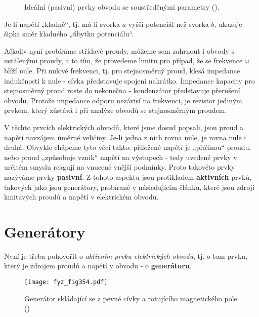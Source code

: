   \begin{figure}[hb!] %
    \centering
    \caption{Ideální (pasivní) prvky obvodu se soustředěnými parametry
             (\cite[s.~394]{Feynman02}).}
    \label{fyz:fig353}
  \end{figure}
  
  Je-li napětí „kladné“, tj. má-li svorka \(a\) vyšší potenciál než svorka \(b\), ukazuje šipka 
  směr kladného „úbytku potenciálu“.
  
  Ačkoliv nyní probíráme střídavé proudy, můžeme sem zahrnout i obvody s ustálenými proudy, a to 
  tím, že provedeme limitu pro případ, že se frekvence \(\omega\) blíží nule. Při nulové frekvenci, 
  tj. pro stejnosměrný proud, klesá impedance indukčnosti k nule - cívka představuje spojení 
  nakrátko. Impedance kapacity pro stejnosměrný proud roste do nekonečna - kondenzátor představuje 
  přerušení obvodu. Protože impedance odporu nezávisí na frekvenci, je rezistor jediným prvkem, 
  který zůstává i při analýze obvodů se stejnosměrným proudem.
  
  V těchto prvcích elektrických obvodů, které jsme dosud popsali, jsou proud a napětí navzájem 
  úměrné veličiny. Je-li jedna z nich rovna nule, je rovna nule i druhá. Obvykle chápeme tyto věci 
  takto: přiložené napětí je „příčinou“ proudu, nebo proud „způsobuje vznik“ napětí na výstupech - 
  tedy uvedené prvky v určitém smyslu reagují na vnucené vnější podmínky. Proto takovéto prvky 
  nazýváme prvky \textbf{pasivní}. Z tohoto aspektu jsou protikladem \textbf{aktivních} prvků, 
  takových jako jsou generátory, probírané v následujícím článku, které jsou zdroji kmitavých 
  proudů a napětí v elektrickém obvodu.

\section{Generátory}\label{fyz:IIchapXXIIsecII}
  Nyní je třeba pohovořit o \emph{aktivním prvku elektrických obvodů}, tj. o tom prvku, který je 
  zdrojem proudů a napětí v obvodu - o \textbf{generátoru}.
  
  \begin{figure}[ht!] %
    \centering
    \texttt{[image: fyz\_fig354.pdf]}
    \caption{Generátor skládající se z pevné cívky a rotujícího magnetického pole
             (\cite[s.~395]{Feynman02})}
    \label{fyz:fig354}
  \end{figure}
  
